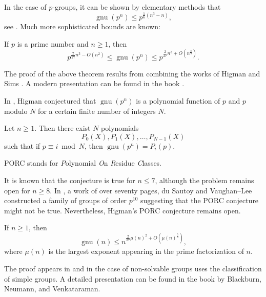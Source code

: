 In the case of $p$-groups, it can be shown by elementary methods 
that
\[
\operatorname{gnu}(p^n)\leq p^{\frac16(n^3-n)},
\]
see \cite[Theorem 5.1]{MR2382539}. Much more sophisticated bounds are known:

\begin{theorem}
If $p$ is a prime number and $n\geq1$, then
\[
p^{\frac{2}{27}n^3-O(n^2)}\leq\operatorname{gnu}(p^n)\leq p^{\frac{2}{27}n^3+O(n^{\frac{8}{3}})}.
\]
\end{theorem}

The proof of the above theorem results from combining the works of Higman \cite{MR113948}
and Sims \cite{MR169921}. A modern presentation can be found in the book
\cite{MR2382539}.

In \cite{MR123605}, Higman conjectured that $\operatorname{gnu}(p^n)$ is a polynomial function of $p$ and $p$ modulo $N$ for a certain
finite number of integers $N$. 

\begin{conjecture}[Higman]
Let $n\geq1$. Then there exist $N$ polynomials
\[
P_{0}(X),P_{1}(X),\dots,P_{N-1}(X)
\]
such that
if $p\equiv i\bmod N$, then $\operatorname{gnu}(p^n)=P_{i}(p)$.
\end{conjecture}

PORC stands for \emph{P}olynomial \emph{O}n \emph{R}esidue \emph{C}lasses.

It is known that the conjecture is true for $n\leq7$, although the problem remains open for $n\geq8$.
In \cite{MR2921623}, a work of over seventy pages,
du Sautoy and Vaughan--Lee constructed a family of groups
of order $p^{10}$ suggesting that the PORC conjecture might not be true. Nevertheless, Higman's PORC conjecture remains open.

\begin{theorem}[Pyber]
If $n\geq1$, then
\[
\operatorname{gnu}(n)\leq n^{\frac{2}{27}\mu(n)^2+O\left(\mu(n)^{\frac{5}{3}}\right)},
\]
where $\mu(n)$ is the largest exponent
appearing in the prime factorization of $n$.
\end{theorem}

The proof appears in \cite{MR1200081} and in the case of non-solvable groups uses the classification of simple groups. A detailed presentation can be found in the book
\cite{MR2382539} by Blackburn, Neumann, and Venkataraman.
